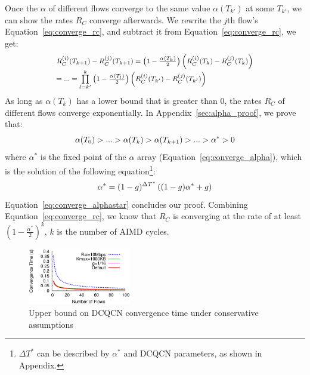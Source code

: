 Once the $\alpha$ of different flows converge to the same value $\alpha(T_{k'})$ at some $T_{k'}$, we can show 
the rates $R_C$ converge afterwards. We rewrite the $j$th flow's Equation~\ref{eq:converge_rc}, and subtract it 
from Equation~\ref{eq:converge_rc}, we get:
\begin{equation}
\small
\begin{array}{l}
R_C^{(i)}({T_{k + 1}}) - R_C^{(j)}({T_{k + 1}}) = \left( {1 - \frac{{\alpha ({T_k})}}{2}} \right)\left( {R_C^{(i)}({T_k}) - R_C^{(j)}({T_k})} \right)\\
 = ... = \prod\limits_{l = k'}^k {\left( {1 - \frac{{\alpha ({T_l})}}{2}} \right)} \left( {R_C^{(i)}({T_{k'}}) - R_C^{(j)}({T_{k'}})} \right)
\end{array}
\label{eq:converge}
\end{equation}
As long as $\alpha ({T_k})$ has a lower bound that is greater than 0, the rates $R_C$ of different flows 
converge exponentially. In Appendix~\ref{sec:alpha_proof}, we prove that:
\begin{equation}
\small
\alpha ({T_0}) > ... > \alpha ({T_k}) > \alpha ({T_{k + 1}}) > ... > {\alpha ^*} > 0
\label{eq:converge_alphastar}
\end{equation}
where $\alpha^{*}$ is the fixed point of the $\alpha$ array (Equation~\ref{eq:converge_alpha}),
which is the solution of the following equation\footnote{${\Delta {T^*}}$ can be described by 
$\alpha^{*}$ and DCQCN parameters, as shown in Appendix.}:
\begin{equation}
\small
{\alpha ^*} = {(1 - g)^{\Delta {T^*}}}\left( {(1 - g){\alpha ^*} + g} \right)
\end{equation}
Equation~\ref{eq:converge_alphastar} concludes our proof. Combining Equation~\ref{eq:converge_rc}, 
we know that $R_C$ is converging at the rate of at least $( {1 - \frac{{{\alpha ^{*}}}}{2}} )^k$, 
$k$ is the number of AIMD cycles.

\begin{figure}[t]
\center
\includegraphics[width=0.4\textwidth]{figures/dcqcn_convergence_time.eps}
\caption{Upper bound on DCQCN convergence time under conservative assumptions}
\label{fig:dcqcn_convergence_time}
\end{figure}

